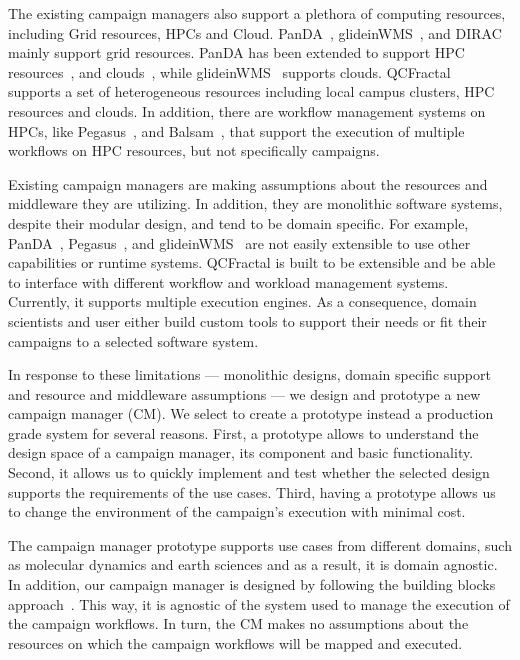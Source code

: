 The existing campaign managers also support a plethora of computing resources, including Grid resources, HPCs and Cloud.
PanDA~\cite{maeno2008panda}, glideinWMS~\cite{sfiligoi2008glidein}, and DIRAC~\cite{casajus2010dirac} mainly support grid resources.
PanDA has been extended to support HPC resources~\cite{de2015future, de2016accelerating}, and clouds~\cite{de2016accelerating}, while glideinWMS~\cite{sfiligoi2008glidein} supports clouds.
QCFractal~\cite{qcfractal} supports a set of heterogeneous resources including local campus clusters, HPC resources and clouds.
In addition, there are workflow management systems on HPCs, like Pegasus~\cite{deelman2015pegasus}, and Balsam~\cite{salim2019balsam}, that support the execution of multiple workflows on HPC resources, but not specifically campaigns.

Existing campaign managers are making assumptions about the resources and middleware they are utilizing.
In addition, they are monolithic software systems, despite their modular design, and tend to be domain specific.
For example, PanDA~\cite{maeno2008panda}, Pegasus~\cite{deelman2015pegasus}, and glideinWMS~\cite{sfiligoi2008glidein} are not easily extensible to use other capabilities or runtime systems.
QCFractal is built to be extensible and be able to interface with different workflow and workload management systems. Currently, it supports multiple execution engines.
As a consequence, domain scientists and user either build custom tools to support their needs or fit their campaigns to a selected software system.

In response to these limitations --- monolithic designs, domain specific support and resource and middleware assumptions --- we design and prototype a new campaign manager (CM).
We select to create a prototype instead a production grade system for several reasons.
First, a prototype allows to understand the design space of a campaign manager, its component and basic functionality.
Second, it allows us to quickly implement and test whether the selected design supports the requirements of the use cases.
Third, having a prototype allows us to change the environment of the campaign's execution with minimal cost.

The campaign manager prototype supports use cases from different domains, such as molecular dynamics and earth sciences and as a result, it is domain agnostic.
In addition, our campaign manager is designed by following the building blocks approach~\cite{turilli2019middleware}.
This way, it is agnostic of the system used to manage the execution of the campaign workflows.
In turn, the CM makes no assumptions about the resources on which the campaign workflows will be mapped and executed.

